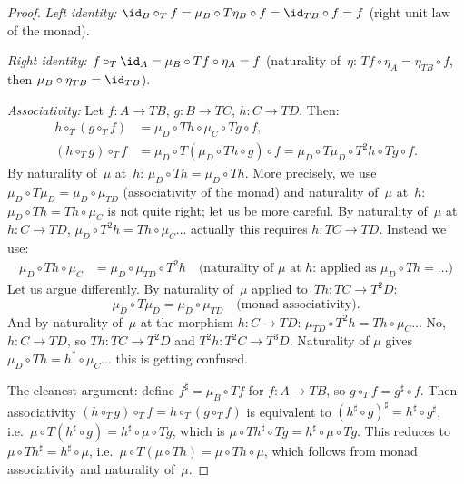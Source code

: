 \begin{proof}
\textit{Left identity:}
$\id_B\circ_T f = \mu_B\circ T\eta_B\circ f = \id_{TB}\circ f = f$
(right unit law of the monad).

\textit{Right identity:}
$f\circ_T\id_A = \mu_B\circ Tf\circ\eta_A = f$
(naturality of~$\eta$: $Tf\circ\eta_A = \eta_{TB}\circ f$, then
$\mu_B\circ\eta_{TB} = \id_{TB}$).

\textit{Associativity:}
Let $f\colon A\to TB$, $g\colon B\to TC$, $h\colon C\to TD$.  Then:
\begin{align*}
    h\circ_T(g\circ_T f)
    &= \mu_D\circ Th\circ\mu_C\circ Tg\circ f, \\
    (h\circ_T g)\circ_T f
    &= \mu_D\circ T(\mu_D\circ Th\circ g)\circ f
    = \mu_D\circ T\mu_D\circ T^2h\circ Tg\circ f.
\end{align*}
By naturality of~$\mu$ at~$h$: $\mu_D\circ Th = \mu_D\circ Th$.
More precisely, we use $\mu_D\circ T\mu_D = \mu_D\circ\mu_{TD}$
(associativity of the monad) and naturality of~$\mu$ at~$h$:
$\mu_D\circ Th = Th \circ \mu_C$ is not quite right; let us be
more careful.  By naturality of~$\mu$ at $h\colon C\to TD$,
$\mu_D\circ T^2h = Th\circ\mu_C$... actually this requires
$h\colon TC\to TD$.  Instead we use:
\begin{align*}
    \mu_D\circ Th\circ\mu_C
    &= \mu_D\circ\mu_{TD}\circ T^2h \quad\text{(naturality of $\mu$ at $h$: applied as $\mu_D\circ Th = \ldots$)}
\end{align*}
Let us argue differently.  By naturality of~$\mu$ applied to~$Th\colon TC\to T^2D$:
\[
    \mu_D\circ T\mu_D = \mu_D\circ\mu_{TD}
    \quad\text{(monad associativity)}.
\]
And by naturality of~$\mu$ at the morphism $h\colon C\to TD$:
$\mu_{TD}\circ T^2 h = Th\circ\mu_C$... No, $h\colon C\to TD$,
so $Th\colon TC\to T^2D$ and $T^2h\colon T^2C\to T^3D$.
Naturality of $\mu$ gives $\mu_D\circ Th = h^*\circ\mu_C$... this is
getting confused.

The cleanest argument: define $f^{\sharp} = \mu_B\circ Tf$ for
$f\colon A\to TB$, so $g\circ_T f = g^{\sharp}\circ f$.  Then
associativity $(h\circ_T g)\circ_T f = h\circ_T(g\circ_T f)$
is equivalent to $(h^{\sharp}\circ g)^{\sharp} = h^{\sharp}\circ g^{\sharp}$,
i.e.\ $\mu\circ T(h^{\sharp}\circ g) = h^{\sharp}\circ\mu\circ Tg$,
which is $\mu\circ Th^{\sharp}\circ Tg = h^{\sharp}\circ\mu\circ Tg$.
This reduces to $\mu\circ Th^{\sharp} = h^{\sharp}\circ\mu$,
i.e.\ $\mu\circ T(\mu\circ Th) = \mu\circ Th\circ\mu$, which follows
from monad associativity and naturality of~$\mu$.
\end{proof}

